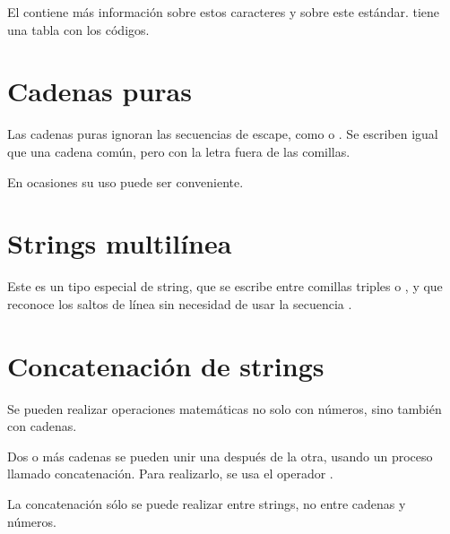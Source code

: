 
El  contiene más información sobre estos caracteres y sobre este estándar.
 tiene una tabla con los códigos.

\section{Cadenas puras}

Las cadenas puras  ignoran las secuencias de escape, como  o .
Se escriben igual que una cadena común, pero con la letra  fuera de las comillas.


En ocasiones su uso puede ser conveniente.

\section{Strings multilínea}

Este es un tipo especial de string, que se escribe entre comillas triples \ttt{\q\q\q \q\q\q} o \ttt{\qq\qq\qq \qq\qq\qq}, y que reconoce los saltos de línea sin necesidad de usar la secuencia .


\section{Concatenación de strings}

Se pueden realizar operaciones matemáticas no solo con números, sino también con cadenas.
\medskip

Dos o más cadenas se pueden unir una después de la otra, usando un proceso llamado concatenación.
Para realizarlo, se usa el operador \ttt{+}.


La concatenación sólo se puede realizar entre strings, no entre cadenas y números.


